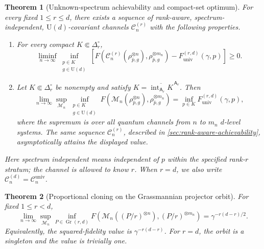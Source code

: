 \documentclass[11pt]{article}
\newtheorem{theorem}{Theorem}[section]
\theoremstyle{remark}
\theoremstyle{plain}
\newcommand{\cC}{\mathcal C}
\newcommand{\cM}{\mathcal M}
\newcommand{\U}{\mathrm U}
\newcommand{\Gr}{\operatorname{Gr}}
\newcommand{\ot}{\otimes}
\newcommand{\Funiv}{F_{\mathrm{univ}}}
\begin{document}
\begin{theorem}[Unknown-spectrum achievability and compact-set optimum]
\label{thm:unknown-optimum}
For every fixed \(1\le r\le d\), there exists a sequence of rank-aware,
spectrum-independent, \(\U(d)\)-covariant channels \(\cC_n^{(r)}\) with the
following properties.
\begin{enumerate}
\item[(a)] For every compact \(K\Subset\Delta_r^\circ\),
\begin{equation}\label{eq:unknown-uniform-achievability}
  \liminf_{n\to\infty}
  \inf_{\substack{p\in K\\g\in\U(d)}}
  \left[
  F\!\left(
    \cC_n^{(r)}(\rho_{\bar p,g}^{\ot n}),
    \rho_{\bar p,g}^{\ot m_n}
  \right)-\Funiv^{(r,d)}(\gamma,p)
  \right]\ge0.
\end{equation}

\item[(b)] Let \(K\Subset\Delta_r^\circ\) be nonempty and
  satisfy
  \(K=\overline{\operatorname{int}_{\mathsf A_r}K}^{\,\mathsf A_r}\).
Then
\begin{equation}\label{eq:compact-global-value}
  \lim_{n\to\infty}
  \sup_{\cM_n}
  \inf_{\substack{p\in K\\g\in\U(d)}}
  F\!\left(\cM_n(\rho_{\bar p,g}^{\ot n}),
             \rho_{\bar p,g}^{\ot m_n}\right)
  =\inf_{p\in K}\Funiv^{(r,d)}(\gamma,p),
\end{equation}
where the supremum is over all quantum channels from \(n\) to \(m_n\)
\(d\)-level systems.  The same sequence \(\cC_n^{(r)}\), described in
\cref{sec:rank-aware-achievability}, asymptotically
attains the displayed value.
\end{enumerate}
Here spectrum independent means independent of \(p\) within the specified
rank-\(r\) stratum; the channel is allowed to know \(r\).  When \(r=d\), we
also write \(\cC_n^{(d)}=\cC_n^{\mathrm{univ}}\).
\end{theorem}

\begin{theorem}[Proportional cloning on the Grassmannian projector orbit]
\label{thm:grassmann}
For fixed \(1\le r<d\),
\begin{equation}\label{eq:grassmann-value}
  \lim_{n\to\infty}\sup_{\cM_n}\inf_{P\in\Gr(r,d)}
  F\!\left(\cM_n((P/r)^{\ot n}),(P/r)^{\ot m_n}\right)
  =\gamma^{-r(d-r)/2}.
\end{equation}
Equivalently, the squared-fidelity value is \(\gamma^{-r(d-r)}\).
For \(r=d\), the orbit is a singleton and the value is trivially one.
\end{theorem}
\end{document}
